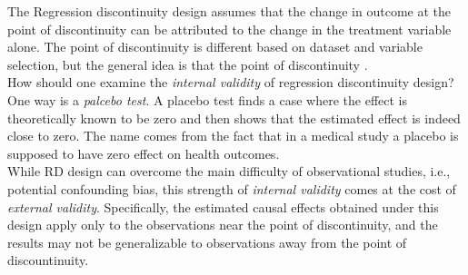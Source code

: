 \documentclass{article}
\begin{document}
    \noindent The Regression discontinuity design assumes that the change in
outcome at the point of discontinuity can be attributed to the change in the
treatment variable alone. The point of discontinuity is different based on
dataset and variable selection, but the general idea is that the point of
discontinuity .\\

    \noindent How should one examine the \textit{internal validity} of
regression discontinuity design? One way is a \textit{palcebo test}. A
placebo test finds a case where the effect is theoretically known to be zero
and then shows that the estimated effect is indeed close to zero. The name
comes from the fact that in a medical study a placebo is supposed to have
zero effect on health outcomes.\\

    \noindent While RD design can overcome the main difficulty of
observational studies, i.e., potential confounding bias, this strength of \textit{internal validity} comes at the cost of \textit{external validity}. Specifically, the estimated causal effects obtained under this design apply only to the observations near the point of discontinuity, and the results may not be generalizable to observations away from the point of discountinuity.
\end{document}
